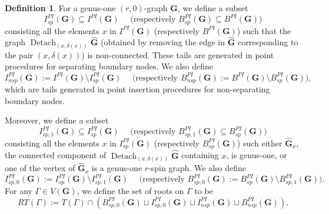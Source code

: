 \documentclass[11pt]{amsart}
\theoremstyle{definition}
\newtheorem{dfn}[dummy]{Definition}
\theoremstyle{remark}
\newcommand{\<}{\left<}
\renewcommand{\>}{\right>}
\numberwithin{equation}{section}
\begin{document}
\begin{dfn}
For a genus-one $(r,0)$-graph $\mathbf{G}$, we define a subset
$$I^{PI}_{sp}(\mathbf{G})\subseteq I^{PI}(\mathbf{G}) \quad\text{  (respectively } B^{PI}_{sp}(\mathbf{G})\subseteq B^{PI}(\mathbf{G})\text{)}$$ consisting all the elements $x$ in $I^{PI}(\mathbf{G})$ (respectively $B^{PI}(\mathbf{G})$) such that the graph $\operatorname{Detach}_{(x,\delta(x))}\hat{\mathbf{G}}$ (obtained by removing the edge in $\hat{\mathbf{G}}$ corresponding to the pair $(x,\delta(x))$) %
is non-connected. These %
tails are generated in point procedures for separating boundary nodes. 
We also define 
$$I^{PI}_{nsp}(\mathbf{G}):=I^{PI}(\mathbf{G})\setminus I^{PI}_{sp}(\mathbf{G}) \quad \text{  (respectively } B^{PI}_{nsp}(\mathbf{G}):=B^{PI}(\mathbf{G})\setminus B^{PI}_{sp}(\mathbf{G})\text{)},$$
which are tails generated in point insertion procedures for non-separating boundary nodes.

Moreover, we define a subset
$$I^{PI}_{sp,1}(\mathbf{G})\subseteq I^{PI}_{sp}(\mathbf{G}) \quad\text{  (respectively } B^{PI}_{sp,1}(\mathbf{G})\subseteq B^{PI}_{sp}(\mathbf{G})\text{)}$$ consisting all the elements $x$ in $I^{PI}_{sp}(\mathbf{G})$ (respectively $B^{PI}_{sp}(\mathbf{G})$) such either $\hat{\mathbf{G}}_{x}$, the connected component of $\operatorname{Detach}_{(x,\delta(x))}\hat{\mathbf{G}}$ containing $x$, is genus-one, or one of  the vertex of $\hat{\mathbf{G}}_{x}$ is a genus-one $r$-spin graph. We also %
define
$$I^{PI}_{sp,0}(\mathbf{G}):=I^{PI}_{sp}(\mathbf{G})\setminus I^{PI}_{sp,1}(\mathbf{G}) \quad \text{  (respectively } B^{PI}_{sp,0}(\mathbf{G}):=B^{PI}_{sp}(\mathbf{G})\setminus B^{PI}_{sp,1}(\mathbf{G})\text{)}.$$
For %
any $\Gamma\in V(\bm{G})$, we define the set of roots on $\Gamma$ to be
\begin{equation}\label{eq root for vertices of PI graph}
RT(\Gamma):=T(\Gamma)\cap(B^{PI}_{sp,0}(\mathbf{G})\sqcup I^{PI}_{sp,0}(\mathbf{G})\sqcup I^{PI}_{nsp}(\mathbf{G})\sqcup B^{PI}_{nsp}(\mathbf{G})).
\end{equation}
\end{dfn}
\end{document}
